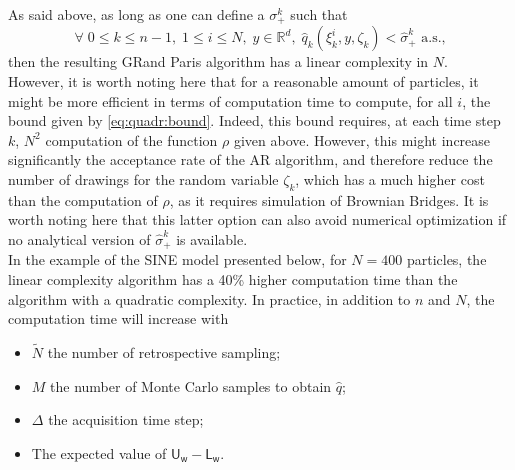 \documentclass[12pt]{article}
\newcommand{\eqsp}{\;}
\newcommand{\1}{\mathrm{1}}
\newcommand{\mw}{\mathsf{w}}%
\newcommand{\U}{\mathsf{U}}
\newcommand{\Lo}{\mathsf{L}}
\begin{document}
As said above, as long as one can define a $\sigma_+^k$ such that
$$ \forall\eqsp 0\leq k\leq n-1,\eqsp 1\leq i\leq N,\eqsp y\in\mathbb{R}^d,\eqsp \hat{q}_k(\xi_k^i,y,\zeta_k)<\hat{\sigma}_+^k \text{ a.s.,}$$ then the resulting GRand Paris algorithm has a linear complexity in $N$.\\
However, it is worth noting here that for a reasonable amount of particles, it might be more efficient in terms of computation time to compute, for all $i$, the bound given by \eqref{eq:quadr:bound}. Indeed, this bound requires, at each time step $k$, $N^2$ computation of the function $\rho$ given above. However, this might increase significantly the acceptance rate of the AR algorithm, and therefore reduce the number of drawings for the random variable $\zeta_k$, which has a much higher cost than the computation of $\rho$, as it requires simulation of Brownian Bridges. It is worth noting here that this latter option can also avoid numerical optimization if no analytical version of $\hat{\sigma}_+^k$ is available.\\
In the example of the SINE model presented below, for $N=400$ particles, the linear complexity algorithm has a 40\% higher computation time than the algorithm with a quadratic complexity. In practice, in addition to $n$ and $N$, the computation time will increase with
\begin{itemize}
\item $\tilde{N}$ the number of retrospective sampling;
\item $M$ the number of Monte Carlo samples to obtain $\hat{q}$;
\item $\Delta$ the acquisition time step;
\item The expected value of $\U_\mw-\Lo_\mw$.
\end{itemize}
\end{document}
